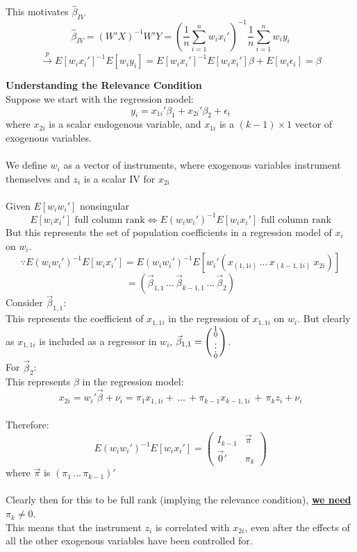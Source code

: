 \documentclass[DIV=14,titlepage=false]{scrreprt}
\begin{document}
This motivates \(\hat\beta_{IV}\)
\[\hat\beta_{IV}=(W'X)^{-1}W'Y=\left(\frac{1}{n}\sum_{i=1}^nw_ix_i'\right)^{-1}\frac{1}{n}\sum_{i=1}^nw_iy_i\]
\[\xrightarrow{p}E[w_ix_i']^{-1}E[w_iy_i]=E[w_ix_i']^{-1}E[w_ix_i']\beta+E[w_i\epsilon_i]=\beta\]
\begin{note} \textbf{Understanding the Relevance Condition} \\
    Suppose we start with the regression model:
    \[y_i=x_{1i}'\beta_1+x_{2i}'\beta_2 + \epsilon_i\]
    where \(x_{2i}\) is a scalar endogenous variable, and \(x_{1i}\) is a \((k-1)\times1\) vector of exogenous variables.
    \\ \\ We define \(w_i\) as a vector of instruments, where exogenous variables instrument themselves and \(z_i\) is a scalar IV for \(x_{2i}\)
    \\ \\ Given \(E[w_iw_i']\) nonsingular
    \[E[w_ix_i'] \text{ full column rank} \iff E(w_iw_i')^{-1}E[w_ix_i']\text{ full column rank}\]
    But this represents the set of population coefficients in a regression model of \(x_i\) on \(w_i\).
    \[\because E(w_iw_i')^{-1}E[w_ix_i']=E(w_iw_i')^{-1}E[w_i'(x_{(1,1i)}\, ...\,x_{(k-1,1i)}\: x_{2i})]\]
    \[=(\vec\beta_{1,1}\, ...\, \vec\beta_{k-1,1}\, ...\, \vec\beta_2)\]
Consider \(\vec\beta_{1,1}\):
\\ This represents the coefficient of \(x_{1,1i}\) in the regression of \(x_{1,1i}\) on \(w_i\).
But clearly as \(x_{1,1i}\) is included as a regressor in \(w_i\), \(\vec\beta_{1,1}=\begin{psmallmatrix} 1 \\ 0 \\ \vdots \\ 0 \end{psmallmatrix}\).
\\ For \(\vec\beta_2\):
\\ This represents \(\beta\) in the regression model:
\[x_{2i}=w_i'\vec\beta+\nu_i= \pi_1x_{1,1i} + \,...\, + \pi_{k-1}x_{k-1,1i} \,+\, \pi_kz_i + \nu_i\]
\\Therefore: \[E(w_iw_i')^{-1}E[w_ix_i']= \begin{pmatrix} I_{k-1} & \vec\pi \\ \vec0' & \pi_k \end{pmatrix}\]
where \(\vec\pi\) is \((\pi_1\, ...\, \pi_{k-1})'\)
\\ \\
Clearly then for this to be full rank (implying the relevance condition), \underline{\textbf{we need \(\pi_k\neq0\)}}.
\\ This means that the instrument \(z_i\) is correlated with \(x_{2i}\), even after the effects of all the other exogenous variables have been controlled for.

\end{note}
\end{document}
